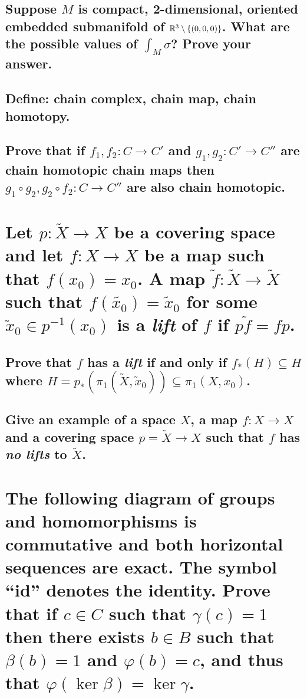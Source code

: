 \documentclass[10pt]{article}
\begin{document}
\subsection{Suppose $M$ is compact, 2-dimensional, oriented embedded submanifold of $\mathbb{R}^3
  \setminus \{(0,0,0)\}$. What are the possible values of $\int_M \sigma$? Prove your answer.}

\advsection{}

\subsection{Define: chain complex, chain map, chain homotopy.}

\subsection{Prove that if $f_1, f_2 : C \to C'$ and $g_1, g_2 : C' \to C''$ are chain homotopic
  chain maps then $g_1 \circ g_2, g_2 \circ f_2 : C \to C''$ are also chain homotopic.}

\section{Let $p: \tilde{X} \to X$ be a covering space and let $f: X \to X$ be a map such that
  $f(x_0) = x_0$. A map $\tilde{f} : \tilde{X} \to \tilde{X}$ such that $f(\tilde{x_0}) =
  \tilde{x}_0$ for some $\tilde{x}_0 \in p^{-1} (x_0)$ is a \emph{lift} of $f$ if $p\tilde{f} =
  fp$.}

\subsection{Prove that $f$ has a \emph{lift} if and only if $f_*(H) \subseteq H$ where $H =
  p_*(\pi_1(\tilde{X}, \tilde{x}_0)) \subseteq \pi_1(X, x_0)$.}

\subsection{Give an example of a space $X$, a map $f : X \to X$ and a covering space $p = \tilde{X}
  \to X$ such that $f$ has \emph{no lifts} to $\tilde{X}$.}

\section{The following diagram of groups and homomorphisms is commutative and both horizontal
  sequences are exact. The symbol ``id'' denotes the identity. Prove that if $c \in C$ such that
  $\gamma(c) =1$ then there exists $b \in B$ such that $\beta(b) =1$ and $\varphi(b) =c$, and thus
  that $\varphi( \ker \beta) = \ker \gamma$.}
\end{document}
